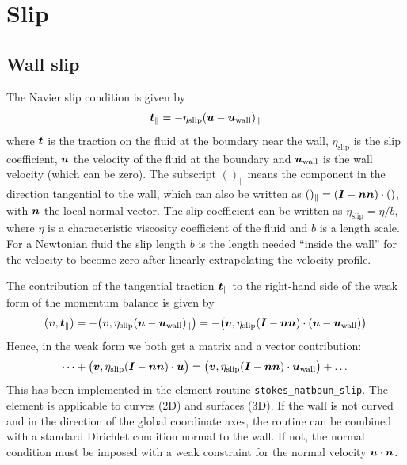 
\def\headdate{17th November 2022}

\section{Slip}

\subsection{Wall slip}

The Navier slip condition is given by
\begin{equation}
   \boldsymbol{t}_\| =
   -\eta_\text{slip} (\boldsymbol{u} - \boldsymbol{u}_\text{wall})_\|
   \label{eq:slip1}
\end{equation}
where $\boldsymbol{t}$ is the traction on the fluid at the boundary near the wall,
$\eta_\text{slip}$ is the slip coefficient,
$\boldsymbol{u}$ the velocity of the fluid at the boundary and $\boldsymbol{u}_\text{wall}$ is
the wall velocity (which can be zero). The subscript $()_\|$ means the
component in the direction tangential to the wall, which can also be written
as $()_\|=(\boldsymbol{I}-\boldsymbol{n}\boldsymbol{n})\cdot()$, with $\boldsymbol{n}$ the local normal vector.
 The slip coefficient can be written as
$\eta_\text{slip}=\eta/b$, where $\eta$ is a characteristic viscosity
coefficient of the fluid
and $b$ is a length scale. For a Newtonian fluid the slip length $b$ is the
length needed ``inside the wall'' for the velocity to become zero after
linearly extrapolating the velocity profile.

The contribution of the tangential traction $\boldsymbol{t}_\|$
to the right-hand side of the weak form of the momentum balance is given by
\begin{equation}
   (\boldsymbol{v}, \boldsymbol{t}_\|)=
-\big(\boldsymbol{v},\eta_\text{slip} (\boldsymbol{u} - \boldsymbol{u}_\text{wall})_\|\big)=
-\big(\boldsymbol{v},\eta_\text{slip} (\boldsymbol{I}-\boldsymbol{n}\boldsymbol{n})\cdot
                            (\boldsymbol{u} - \boldsymbol{u}_\text{wall})\big)
   \label{eq:slip2}
\end{equation}
Hence, in the weak form we both get a matrix and a vector contribution:
\begin{equation}
  \dots + \big(\boldsymbol{v},\eta_\text{slip} (\boldsymbol{I}-\boldsymbol{n}\boldsymbol{n})\cdot\boldsymbol{u}\big)=
\big(\boldsymbol{v},\eta_\text{slip} (\boldsymbol{I}-\boldsymbol{n}\boldsymbol{n})\cdot\boldsymbol{u}_\text{wall}\big)
+\dots 
\end{equation}
This has been implemented in the element routine
\texttt{stokes\_natboun\_slip}. The element is applicable to curves (2D) and
surfaces (3D). If the wall is not curved and in the direction of the global
coordinate axes, the routine can be combined with a standard Dirichlet
condition normal to the wall. If not, the normal condition must be imposed
with a weak constraint for the normal velocity $\boldsymbol{u}\cdot\boldsymbol{n}$.

